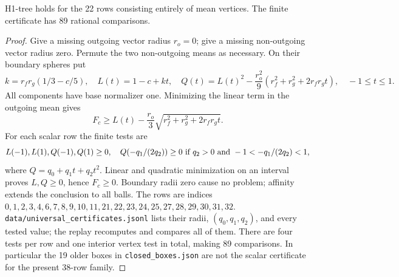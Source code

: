 \begin{htlem}\label{ht:scalar}
H1-tree holds for the 22 rows consisting entirely of mean vertices.
The finite certificate has 89 rational comparisons.
\end{htlem}
\begin{proof}
Give a missing outgoing vector radius \(r_o=0\); give a missing
non-outgoing vector radius zero. Permute the two non-outgoing means
as necessary. On their boundary spheres put
\[
 k=r_fr_g(1/3-c/5),\quad L(t)=1-c+kt,\quad
 Q(t)=L(t)^2-\frac{r_o^2}{9}
                  (r_f^2+r_g^2+2r_fr_gt),\quad -1\le t\le1.
\]
All components have base normalizer one. Minimizing the linear term
in the outgoing mean gives
\[
 F_c\ge L(t)-\frac{r_o}{3}
                    \sqrt{r_f^2+r_g^2+2r_fr_gt}.
\]
For each scalar row the finite tests are
\begin{equation}\label{ht:scalartests}
 L(-1),L(1),Q(-1),Q(1)\ge0,
 \quad Q(-q_1/(2q_2))\ge0
 \ \hbox{if }q_2>0\hbox{ and }-1<-q_1/(2q_2)<1,
\end{equation}
where \(Q=q_0+q_1t+q_2t^2\). Linear and quadratic minimization on
an interval proves \(L,Q\ge0\), hence \(F_c\ge0\). Boundary radii
zero cause no problem; affinity extends the conclusion to all balls.
The rows are indices
\(0,1,2,3,4,6,7,8,9,10,11,21,22,23,24,25,27,28,29,30,31,32\).
\texttt{data/\allowbreak universal\_certificates.jsonl} lists their radii,
\((q_0,q_1,q_2)\), and every tested value; the replay recomputes and
compares all of them. There are four tests per row and one interior
vertex test in total, making 89 comparisons. In particular the 19
older boxes in \texttt{closed\_boxes.json} are not the scalar
certificate for the present 38-row family.
\end{proof}

